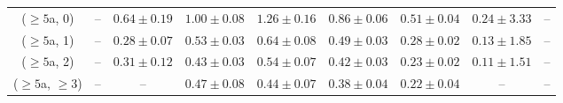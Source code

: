\begin{table}[h!]
{\begin{tabular}{ccccccccc}
	($\ge5$a, 0) & -- & $0.64\pm 0.19$ & $1.00\pm 0.08$ & $1.26\pm 0.16$ & $0.86\pm 0.06$ & $0.51\pm 0.04$ & $0.24\pm 3.33$ & -- \\[0.5ex] 
	($\ge5$a, 1) & -- & $0.28\pm 0.07$ & $0.53\pm 0.03$ & $0.64\pm 0.08$ & $0.49\pm 0.03$ & $0.28\pm 0.02$ & $0.13\pm 1.85$ & -- \\[0.5ex] 
	($\ge5$a, 2) & -- & $0.31\pm 0.12$ & $0.43\pm 0.03$ & $0.54\pm 0.07$ & $0.42\pm 0.03$ & $0.23\pm 0.02$ & $0.11\pm 1.51$ & -- \\[0.5ex] 
	($\ge5$a, $\ge3$) & -- & -- & $0.47\pm 0.08$ & $0.44\pm 0.07$ & $0.38\pm 0.04$ & $0.22\pm 0.04$ & -- & -- \\[0.5ex] 
	\hline
	\hline
\end{tabular}}
\end{table}
